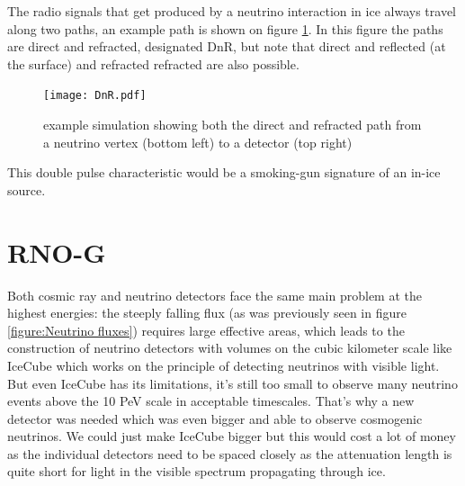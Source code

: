 The radio signals that get produced by a neutrino interaction in ice always
travel along two paths, an example path is shown on figure \ref{fig:DnR}.  In
this figure the paths are direct and refracted, designated DnR, but note that
direct and reflected (at the surface) and refracted refracted are also
possible.
\begin{figure}
  \centering
  \texttt{[image: DnR.pdf]}
  \caption{example simulation showing both the direct and refracted path from a neutrino vertex (bottom left) to a detector (top right)}
  \label{fig:DnR}
\end{figure}
This double pulse characteristic would be a smoking-gun signature of an in-ice
source.
\section{RNO-G}
Both cosmic ray and neutrino detectors face the same main problem at the
highest energies: the steeply falling flux (as was previously seen in figure
\ref{figure:Neutrino fluxes}) requires large effective areas, which leads to
the construction of neutrino detectors with volumes on the cubic kilometer
scale like IceCube\cite{IceCubeTechnical} which works on the principle of
detecting neutrinos with visible light.  But even IceCube has its limitations,
it's still too small to observe many neutrino events above the 10 PeV
scale\cite{IceCubeGen2} in acceptable timescales. That's why a new detector was needed which was even
bigger and able to observe cosmogenic neutrinos.  We could just make IceCube
bigger but this would cost a lot of money as the individual detectors need to
be spaced closely as the attenuation length is quite short for light in the
visible spectrum propagating through ice.  

